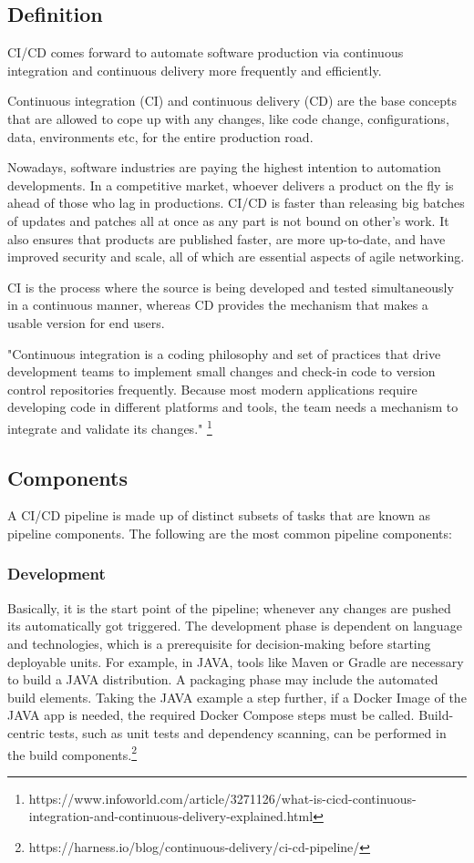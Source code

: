 \subsection{Definition}
%
CI/CD comes forward to automate software production via continuous integration and continuous delivery more frequently and efficiently.

Continuous integration (CI) and continuous delivery (CD) are the base concepts that are allowed to cope up with any changes, like code change, configurations, data, environments etc, for the entire production road\cite{CD}.

Nowadays, software industries are paying the highest intention to automation developments. In a competitive market, whoever delivers a product on the fly is ahead of those who lag in productions. CI/CD is faster than releasing big batches of updates and patches all at once as any part is not bound on other's work. It also ensures that products are published faster, are more up-to-date, and have improved security and scale, all of which are essential aspects of agile networking.

CI is the process where the source is being developed and tested simultaneously in a continuous manner, whereas CD provides the mechanism that makes a usable version for end users\cite{CDHandsOn}.

"Continuous integration is a coding philosophy and set of practices that drive development teams to implement small changes and check-in code to version control repositories frequently. Because most modern applications require developing code in different platforms and tools, the team needs a mechanism to integrate and validate its changes." \footnote{https://www.infoworld.com/article/3271126/what-is-cicd-continuous-integration-and-continuous-delivery-explained.html}

%
\subsection{Components}
%
A CI/CD pipeline is made up of distinct subsets of tasks that are known as pipeline components. The following are the most common pipeline components:

\subsubsection{Development}

Basically, it is the start point of the pipeline; whenever any changes are pushed its automatically got triggered. The development phase is dependent on language and technologies, which is a prerequisite for decision-making before starting deployable units. For example, in JAVA, tools like Maven or Gradle are necessary to build a JAVA distribution. A packaging phase may include the automated build elements. Taking the JAVA example a step further, if a Docker Image of the JAVA app is needed, the required Docker Compose steps must be called. Build-centric tests, such as unit tests and dependency scanning, can be performed in the build components.\footnote{https://harness.io/blog/continuous-delivery/ci-cd-pipeline/}


